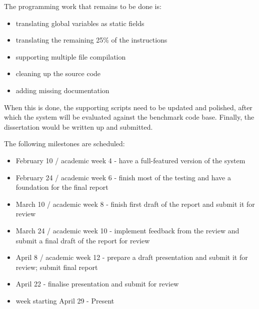 \documentclass[parskip]{cs4rep}
\begin{document}
The programming work that remains to be done is:
\begin{itemize}
\item
translating global variables as static fields
\item
translating the remaining 25\% of the instructions
\item
supporting multiple file compilation
\item
cleaning up the source code
\item
adding missing documentation
\end{itemize}

When this is done, the supporting scripts need to be updated and polished, after which the system will be evaluated against the benchmark code base. Finally, the dissertation would be written up and submitted.

The following milestones are scheduled:
\begin{itemize}
\item
February 10 / academic week 4 - have a full-featured version of the system
\item
February 24 / academic week 6 - finish most of the testing and have a foundation for the final report
\item
March 10 / academic week 8 - finish first draft of the report and submit it for review
\item
March 24 / academic week 10 - implement feedback from the review and submit a final draft of the report for review
\item
April 8 / academic week 12 - prepare a draft presentation and submit it for review; submit final report
\item
April 22 - finalise presentation and submit for review
\item
week starting April 29 - Present
\end{itemize}




\end{document}
